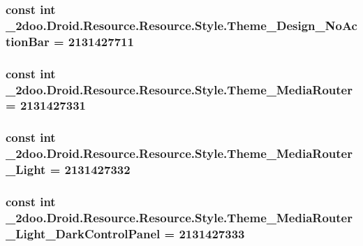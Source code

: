\hypertarget{class__2doo_1_1_droid_1_1_resource_1_1_style_69ce3c6e0163473c9141d1b4a1dc4336}{
\subsubsection[{Theme\_\-Design\_\-NoActionBar}]{\setlength{\rightskip}{0pt plus 5cm}const int \_\-2doo.Droid.Resource.Resource.Style.Theme\_\-Design\_\-NoActionBar = 2131427711}}
\label{class__2doo_1_1_droid_1_1_resource_1_1_style_69ce3c6e0163473c9141d1b4a1dc4336}


\hypertarget{class__2doo_1_1_droid_1_1_resource_1_1_style_de6e8ed0cee7f4682cdc67b11e2f2cd7}{
\subsubsection[{Theme\_\-MediaRouter}]{\setlength{\rightskip}{0pt plus 5cm}const int \_\-2doo.Droid.Resource.Resource.Style.Theme\_\-MediaRouter = 2131427331}}
\label{class__2doo_1_1_droid_1_1_resource_1_1_style_de6e8ed0cee7f4682cdc67b11e2f2cd7}


\hypertarget{class__2doo_1_1_droid_1_1_resource_1_1_style_b11d7bf7457bf8ab2a3219f48cbb3c39}{
\subsubsection[{Theme\_\-MediaRouter\_\-Light}]{\setlength{\rightskip}{0pt plus 5cm}const int \_\-2doo.Droid.Resource.Resource.Style.Theme\_\-MediaRouter\_\-Light = 2131427332}}
\label{class__2doo_1_1_droid_1_1_resource_1_1_style_b11d7bf7457bf8ab2a3219f48cbb3c39}


\hypertarget{class__2doo_1_1_droid_1_1_resource_1_1_style_e0de72a30b455af72fd83ebb123c4217}{
\subsubsection[{Theme\_\-MediaRouter\_\-Light\_\-DarkControlPanel}]{\setlength{\rightskip}{0pt plus 5cm}const int \_\-2doo.Droid.Resource.Resource.Style.Theme\_\-MediaRouter\_\-Light\_\-DarkControlPanel = 2131427333}}
\label{class__2doo_1_1_droid_1_1_resource_1_1_style_e0de72a30b455af72fd83ebb123c4217}



